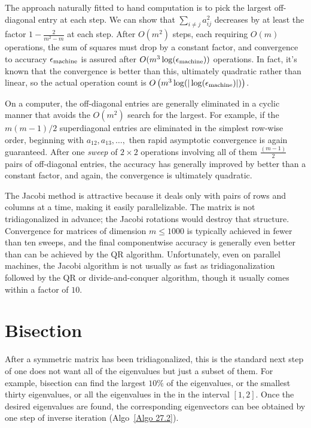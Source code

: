 The approach naturally fitted to hand computation is to pick the largest off-diagonal entry at each step. We can show that $ \sum_{i\neq j} a_{ij}^{2}  $ decreases by at least the factor $ 1 - \frac{2}{m^{2} -m} $ at each step. After $ O(m^2) $ steps, each requiring $ O(m) $ operations, the sum of squares must drop by a constant factor, and convergence to accuracy $ \epsilon_{\text{machine}} $ is assured after $ O(m^3\log (\epsilon_{\text{machine}}))$ operations. In fact, it's known that the convergence is better than this, ultimately quadratic rather than linear, so the actual operation count is $ O\left( m^3 \log( |\log (\epsilon_{\text{machine}})|) \right)  $.

On a computer, the off-diagonal entries are generally eliminated in a cyclic manner that avoids the $ O(m^2) $ search for the largest. For example, if the $ m(m-1)/2 $ superdiagonal entries are eliminated in the simplest row-wise order, beginning with $ a_{12}, a_{13},\ldots, $ then rapid asymptotic convergence is again guaranteed. After one {\it sweep} of $ 2\times 2 $ operations involving all of them $ \frac{(m-1)}{2} $ pairs of off-diagonal entries, the accuracy has generally improved by better than a constant factor, and again, the convergence is ultimately quadratic.   


\begin{note}

The Jacobi method is attractive because it deals only with pairs of rows and columns at a time, making it easily parallelizable. The matrix is not tridiagonalized in advance; the Jacobi rotations would destroy that structure. Convergence for matrices of dimension $ m\le 1000 $ is typically achieved in fewer than ten sweeps, and the final componentwise accuracy is generally even better than can be achieved by the QR algorithm. Unfortunately, even on parallel machines, the Jacobi algorithm is not usually as fast as tridiagonalization followed by the QR or divide-and-conquer algorithm, though it usually comes within a factor of $ 10 $. 
\end{note}

\section{Bisection}
After a symmetric matrix has been tridiagonalized, this is the standard next step of one does not want all of the eigenvalues but just a subset of them.  For example, bisection can find the largest $ 10\% $ of the eigenvalues, or the smallest thirty eigenvalues, or all the eigenvalues in the in the interval $ [1,2] $.  Once the desired eigenvalues are found, the corresponding eigenvectors can bee obtained by one step of inverse iteration (Algo~\ref{Algo 27.2}). 

